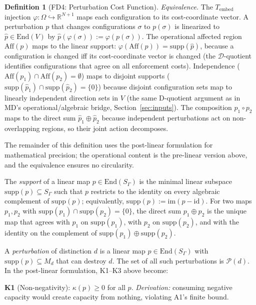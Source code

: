 \documentclass[11pt,a4paper]{article}
\theoremstyle{definition}
\newtheorem{definition}[theorem]{Definition}
\newcommand{\End}{\mathrm{End}}
\newcommand{\im}{\mathrm{im}}
\begin{document}
\begin{definition}[FD4: Perturbation Cost Function]
\smallskip\noindent
\textit{Equivalence.}  The $T_{\mathrm{embed}}$ injection $\varphi: \Omega \hookrightarrow \mathbb{R}^{N+1}$ maps each configuration to its cost-coordinate vector.  A perturbation $p$ that changes configurations $\sigma$ to $p(\sigma)$ is linearized to $\hat{p} \in \End(V)$ by $\hat{p}(\varphi(\sigma)) := \varphi(p(\sigma))$.  The operational affected region $\mathrm{Aff}(p)$ maps to the linear support: $\varphi(\mathrm{Aff}(p)) = \mathrm{supp}(\hat{p})$, because a configuration is changed iff its cost-coordinate vector is changed (the $\mathcal{D}$-quotient identifies configurations that agree on all enforcement costs).  Independence ($\mathrm{Aff}(p_1) \cap \mathrm{Aff}(p_2) = \emptyset$) maps to disjoint supports ($\mathrm{supp}(\hat{p}_1) \cap \mathrm{supp}(\hat{p}_2) = \{0\}$) because disjoint configuration sets map to linearly independent direction sets in $V$ (the same D-quotient argument as in MD's operational/algebraic bridge, Section~\ref{sec:inputs}).  The composition $p_1 \circ p_2$ maps to the direct sum $\hat{p}_1 \oplus \hat{p}_2$ because independent perturbations act on non-overlapping regions, so their joint action decomposes.

The remainder of this definition uses the post-linear formulation for mathematical precision; the operational content is the pre-linear version above, and the equivalence ensures no circularity.

\smallskip\noindent
The \emph{support} of a linear map $p \in \End(S_\Gamma)$ is the minimal linear subspace $\mathrm{supp}(p) \subseteq S_\Gamma$ such that $p$ restricts to the identity on every algebraic complement of $\mathrm{supp}(p)$; equivalently, $\mathrm{supp}(p) := \im(p - \mathrm{id})$.  For two maps $p_1, p_2$ with $\mathrm{supp}(p_1) \cap \mathrm{supp}(p_2) = \{0\}$, the direct sum $p_1 \oplus p_2$ is the unique map that agrees with $p_1$ on $\mathrm{supp}(p_1)$, with $p_2$ on $\mathrm{supp}(p_2)$, and with the identity on the complement of $\mathrm{supp}(p_1) \oplus \mathrm{supp}(p_2)$.

A \emph{perturbation} of distinction $d$ is a linear map $p \in \End(S_\Gamma)$ with $\mathrm{supp}(p) \subseteq M_d$ that can destroy $d$.  The set of all such perturbations is $\mathcal{P}(d)$.  In the post-linear formulation, K1--K3 above become:

\smallskip\noindent
\textbf{K1} (Non-negativity): $\kappa(p) \ge 0$ for all $p$.  \textit{Derivation:} consuming negative capacity would create capacity from nothing, violating A1's finite bound.


\end{definition}
\end{document}
